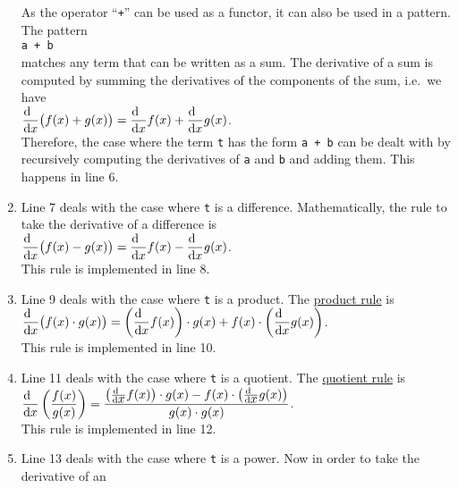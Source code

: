 \begin{enumerate}
      As the operator ``\texttt{+}'' can be used as a functor, it can also be used in a pattern.  The
      pattern 
      \\[0.2cm]
      \hspace*{1.3cm}
      \texttt{a + b}
      \\[0.2cm]
      matches any term that can be written as a sum.  The derivative of a sum is computed by summing the
      derivatives of the components of the sum, i.e.~we have
      \\[0.2cm]
      \hspace*{1.3cm}
      $\displaystyle \frac{\textrm{d}\;\;}{\textrm{d}\mbox{$x$}}\bigl(f(x) + g(x)\bigr) = \frac{\textrm{d}\;\;}{\textrm{d}\mbox{$x$}} f(x) + \frac{\textrm{d}\;\;}{\textrm{d}\mbox{$x$}} g(x)$.
      \\[0.2cm]
      Therefore, the case where the term \texttt{t} has the form \texttt{a + b} can be dealt with by
      recursively computing the derivatives of \texttt{a} and \texttt{b} and adding them.  This
      happens in line 6.
\item Line 7 deals with the case where \texttt{t} is a difference.  Mathematically, the rule to take the
      derivative of a difference is
      \\[0.2cm]
      \hspace*{1.3cm}
      $\displaystyle \frac{\textrm{d}\;\;}{\textrm{d}\mbox{$x$}}\bigl(f(x) - g(x)\bigr) = \frac{\textrm{d}\;\;}{\textrm{d}\mbox{$x$}} f(x) - \frac{\textrm{d}\;\;}{\textrm{d}\mbox{$x$}} g(x)$.
      \\[0.2cm]
      This rule is implemented in line 8.
\item Line 9 deals with the case where \texttt{t} is a product.  The 
      \href{https://en.wikipedia.org/wiki/Product_rule}{product rule} is
      \\[0.2cm]
      \hspace*{1.3cm}
      $\displaystyle \frac{\textrm{d}\;\;}{\textrm{d}\mbox{$x$}}\bigl(f(x) \cdot g(x)\bigr) = \left(\frac{\textrm{d}\;\;}{\textrm{d}\mbox{$x$}} f(x)\right)\cdot g(x) + f(x) \cdot \left(\frac{\textrm{d}\;\;}{\textrm{d}\mbox{$x$}} g(x)\right)$.
      \\[0.2cm]
      This rule is implemented in line 10.
\item Line 11 deals with the case where \texttt{t} is a quotient.  The
      \href{https://en.wikipedia.org/wiki/Quotient_rule}{quotient rule} is 
      \\[0.2cm]
      \hspace*{1.3cm}
      $\displaystyle \frac{\textrm{d}\;\;}{\textrm{d}\mbox{$x$}}\left(\frac{f(x)}{g(x)}\right) = \frac{\left(\frac{\textrm{d}\;\;}{\textrm{d}\mbox{$x$}} f(x)\right)\cdot g(x) - f(x)
        \cdot \left(\frac{\textrm{d}\;\;}{\textrm{d}\mbox{$x$}} g(x)\right)}{g(x) \cdot g(x)}$.
      \\[0.2cm]
      This rule is implemented in line 12.
\item Line 13 deals with the case where \texttt{t} is a power.  Now in order to take the derivative of an

\end{enumerate}
